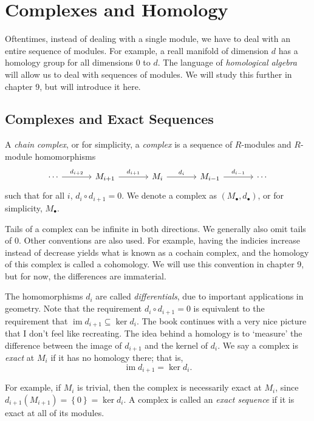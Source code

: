\section{Complexes and Homology}
Oftentimes, instead of dealing with a single module, we have to deal with an entire sequence of modules. For example, a reall manifold of dimension $d$ has a homology group for all dimensions $0$ to $d$. The language of \emph{homological algebra} will allow us to deal with sequences of modules. We will study this further in chapter 9, but will introduce it here.
\subsection{Complexes and Exact Sequences}
\begin{definition}\label{dfn:3.7.1}
	A \emph{chain complex}, or for simplicity, a \emph{complex} is a sequence of $R$-modules and $R$-module homomorphisms
	\[\begin{tikzcd}[row sep=2.5em, column sep=3.5em]
		\cdots \arrow[r, "d_{i+2}"]&M_{i+1}\arrow[r, "d_{i+1}"]&M_{i}\arrow[r, "d_i"]&M_{i-1}\arrow[r, "d_{i-1}"]&\cdots
	\end{tikzcd}\]
	such that for all $i$, $d_i\circ d_{i+1}=0$. We denote a complex as $(M_{\bullet},d_{\bullet})$, or for simplicity, $M_{\bullet}$.
\end{definition}

Tails of a complex can be infinite in both directions. We generally also omit tails of $0$. Other conventions are also used. For example, having the indicies increase instead of decrease yields what is known as a cochain complex, and the homology of this complex is called a cohomology. We will use this convention in chapter 9, but for now, the differences are immaterial.

The homomorphisms $d_i$ are called \emph{differentials}, due to important applications in geometry. Note that the requirement $d_i\circ d_{i+1}=0$ is equivalent to the requirement that $\operatorname{im}d_{i+1}\subseteq \ker d_i $. The book continues with a very nice picture that I don't feel like recreating. The idea behind a homology is to `measure' the difference between the image of $d_{i+1}$ and the kernel of $d_i$. We say a complex is \emph{exact} at $M_i$ if it has no homology there; that is,
\[
	\operatorname{im}d_{i+1}=\ker d_i 
.\]

For example, if $M_i$ is trivial, then the complex is necessarily exact at $M_i$, since $d_{i+1}(M_{i+1})=\left\{ 0 \right\} =\ker d_i$. A complex is called an \emph{exact sequence} if it is exact at all of its modules.

